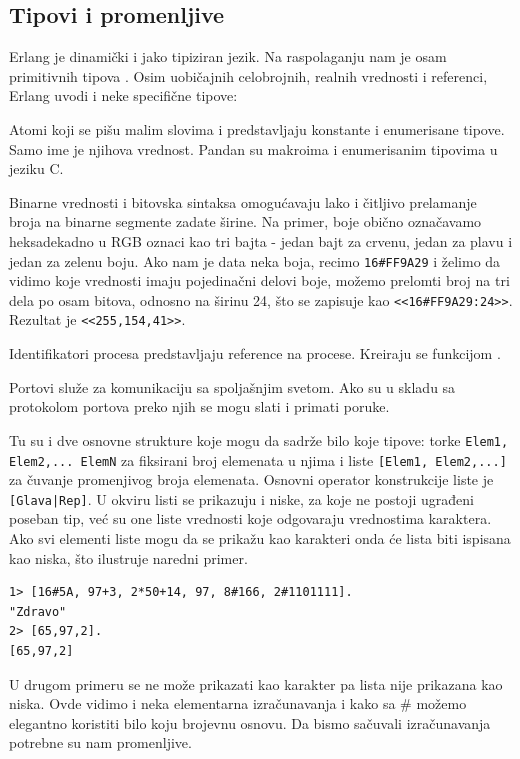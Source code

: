 \documentclass[a4paper]{article}
\begin{document}
\subsection{Tipovi i promenljive}
Erlang je dinamički i jako tipiziran jezik. 
Na raspolaganju nam je osam primitivnih tipova \cite{phdthesis}. 
Osim uobičajnih celobrojnih, realnih vrednosti i referenci, Erlang uvodi i neke specifične tipove:
\begin{list}{•}{}
\item Atomi koji se pišu malim slovima i predstavljaju konstante i enumerisane tipove. Samo ime je njihova vrednost. Pandan su makroima i enumerisanim tipovima u jeziku C.
\item Binarne vrednosti i bitovska sintaksa omogućavaju lako i čitljivo prelamanje broja na binarne segmente zadate širine. 
Na primer, boje obično označavamo heksadekadno u RGB oznaci kao tri bajta - jedan bajt za crvenu, jedan za plavu i jedan za zelenu boju.
Ako nam je data neka boja, recimo {\texttt{16#FF9A29}} i
želimo da vidimo koje vrednosti imaju pojedinačni delovi boje, možemo
prelomti broj na tri dela po osam bitova, odnosno na širinu 24, što se 
zapisuje kao {\texttt{<<16#FF9A29:24>>}}. Rezultat je {\texttt{<<255,154,41>>}}.
\item Identifikatori procesa predstavljaju reference na procese. Kreiraju se funkcijom \textttspawn.
\item Portovi služe za komunikaciju sa spoljašnjim svetom. Ako su u skladu sa protokolom portova preko njih se mogu slati i primati poruke.
\end{list}
 
Tu su i dve osnovne strukture koje mogu da sadrže bilo koje tipove: torke
{\texttt{{Elem1, Elem2,... ElemN}}} za fiksirani broj elemenata u njima 
i liste {\texttt{[Elem1, Elem2,...]}} za čuvanje promenjivog broja elemenata. 
Osnovni operator konstrukcije liste je {\texttt{[Glava|Rep]}}. 
U okviru listi se prikazuju i niske, za koje ne postoji ugrađeni poseban tip, 
već su one liste vrednosti koje odgovaraju vrednostima karaktera. Ako svi elementi liste mogu da se prikažu kao karakteri onda će lista biti ispisana kao niska, što ilustruje naredni primer.
\begin{verbatim}
1> [16#5A, 97+3, 2*50+14, 97, 8#166, 2#1101111].
"Zdravo"
2> [65,97,2].
[65,97,2]
\end{verbatim}
U drugom primeru se ne može prikazati kao karakter pa lista nije prikazana kao niska. 
Ovde vidimo i neka elementarna izračunavanja i kako sa \# možemo elegantno koristiti bilo koju brojevnu osnovu. 
Da bismo sačuvali izračunavanja potrebne su nam promenljive.\\
\end{document}
